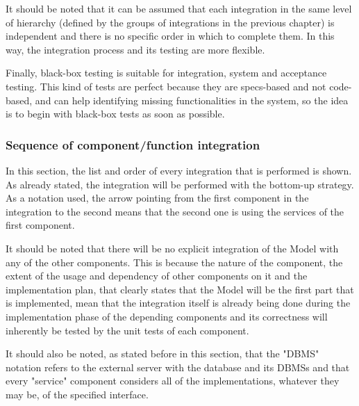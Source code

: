 It should be noted that it can be assumed that each integration in the same level of hierarchy (defined by the groups of integrations in the previous chapter) is independent and there is no specific order in
which to complete them. In this way, the integration process and its testing are more flexible. \newline

Finally, black-box testing is suitable for integration, system and acceptance testing. This kind of tests are perfect because they are specs-based and not code-based, and can help identifying missing functionalities in the system, so the idea is to begin with black-box tests as soon as possible.

\subsubsection{Sequence of component/function integration}
In this section, the list and order of every integration that is performed is shown. As already stated, the integration will be performed with the bottom-up strategy. As a notation used, the arrow pointing from the first component in the integration to the second means that the second one is using the services of the first component. \newline

It should be noted that there will be no explicit integration of the Model with any of the other components. This is because the nature of the component, the extent of the usage and dependency of other components on it and the implementation plan, that clearly states that the Model will be the first part that is implemented, mean that the integration itself is already being done during the implementation phase of the depending components and its correctness will inherently be tested by the unit tests of each component. \newline

It should also be noted, as stated before in this section, that the "DBMS" notation refers to the external server with the database and its DBMSs and that every "service" component considers all of the implementations, whatever they may be, of the specified interface. \newline

